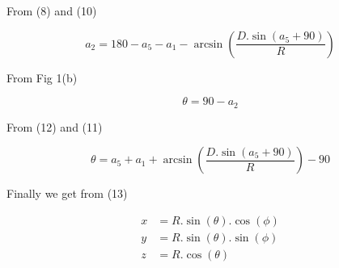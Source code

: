 \documentclass[12pt,twoside,a4paper]{article}
\begin{document}
	From (8) and (10)
	
	\begin{equation}
		a_2 = 180 - a_5 - a_1 - \arcsin \left( \frac {D.\sin(a_5+90)} {R} \right)
	\end{equation}
	
	From Fig 1(b)
	
	\begin{equation}
		\theta = 90 - a_2
	\end{equation}
	
	From (12) and (11)
	
	\begin{equation}
		\theta = a_5 + a_1 + \arcsin \left( \frac {D.\sin(a_5+90)} {R} \right) - 90
	\end{equation}
	
	Finally we get from (13)
	
	\begin{align}
		x &= R.\sin(\theta).\cos(\phi)\\
		y &= R.\sin(\theta).\sin(\phi)\\
		z &= R.\cos(\theta)
	\end{align}
\end{document}
